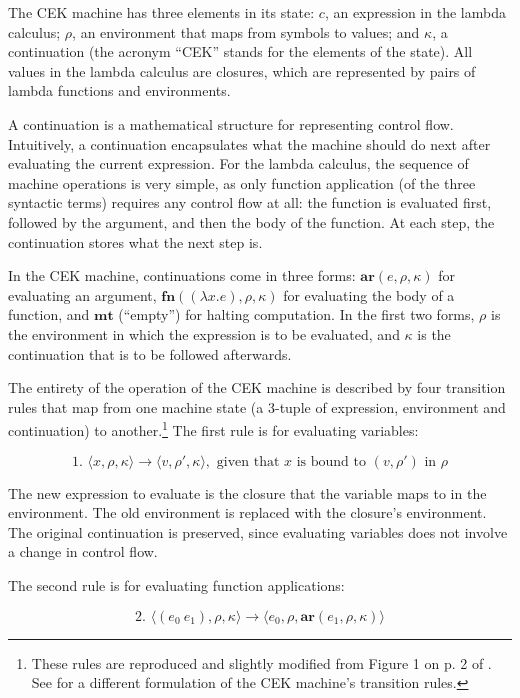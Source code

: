 \documentclass{article}
\begin{document}
The CEK machine has three elements in its state: $c$, an expression in the lambda calculus; $\rho$, an environment that maps from symbols to values; and $\kappa$, a continuation (the acronym ``CEK'' stands for the elements of the state). All values in the lambda calculus are closures, which are represented by pairs of lambda functions and environments.

A continuation is a mathematical structure for representing control flow. Intuitively, a continuation encapsulates what the machine should do next after evaluating the current expression. For the lambda calculus, the sequence of machine operations is very simple, as only function application (of the three syntactic terms) requires any control flow at all: the function is evaluated first, followed by the argument, and then the body of the function. At each step, the continuation stores what the next step is.

In the CEK machine, continuations come in three forms: $\textbf{ar}(e, \rho, \kappa)$ for evaluating an argument, $\textbf{fn}((\lambda x.e), \rho, \kappa)$ for evaluating the body of a function, and $\textbf{mt}$ (``empty'') for halting computation. In the first two forms, $\rho$ is the environment in which the expression is to be evaluated, and $\kappa$ is the continuation that is to be followed afterwards.

The entirety of the operation of the CEK machine is described by four transition rules that map from one machine state (a 3-tuple of expression, environment and continuation) to another.\footnote{These rules are reproduced and slightly modified from Figure 1 on p. 2 of \cite{aam}. See \cite{cek} for a different formulation of the CEK machine's transition rules.} The first rule is for evaluating variables:

$$
\text{1. }
\langle x, \rho, \kappa \rangle
\to
\langle v, \rho', \kappa \rangle,
\text{ given that $x$ is bound to $(v, \rho')$ in $\rho$}
$$

The new expression to evaluate is the closure that the variable maps to in the environment. The old environment is replaced with the closure's environment. The original continuation is preserved, since evaluating variables does not involve a change in control flow.

The second rule is for evaluating function applications:

$$
\text{2. }
\langle (e_0\ e_1), \rho, \kappa \rangle
\to
\langle e_0, \rho, \textbf{ar}(e_1, \rho, \kappa) \rangle
$$
\end{document}

